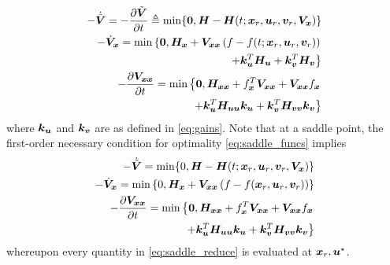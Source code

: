 %
\begin{subequations}
	\begin{align}
		- \dot{ \tilde{\bm{V}}} = - \dfrac{\partial \tilde{\bm{V}}}{\partial t} \triangleq \min\{\bm{0}, \bm{H} - \bm{H}(t; \bm{x}_r, \bm{u}_r, \bm{v}_r, \bm{V}_{\bm{x}})\} \\
		-\dot{\bm{V}}_{\bm{x}} = \min \left\{\bm{0}, \bm{H}_{\bm{x}} + \bm{V}_{\bm{x}\bm{x}} \left(f-f(t; \bm{x}_r, \bm{u}_r, \bm{v}_r)\right)  \right. \\
		\left.
		+ \bm{k}_{\bm{u}}^T \bm{H}_{\bm{u} } + \bm{k}_{\bm{v}}^T \bm{H}_{\bm{v}} \right\} \\
		-  \dfrac{\partial \bm{V}_{\bm{x} \bm{x}}}{\partial t} = \min \left\{\bm{0}, \bm{H}_{\bm{x} \bm{x}} + f_{\bm{x}}^T\bm{V}_{\bm{x}\bm{x}} + \bm{V}_{\bm{x}\bm{x}} f_{\bm{x}}  \right. \nonumber \\
		\left.
		+ \bm{k}_{\bm{u}}^T \bm{H}_{\bm{u}  \bm{u}}  \bm{k}_{\bm{u}} +  \bm{k}_{\bm{v}}^T \bm{H}_{\bm{v}  \bm{v}}  \bm{k}_{\bm{v}} \right\}
	\end{align}
\end{subequations}
%
where $\bm{k}_{\bm{u}}$ and $\bm{k}_{\bm{v}}$ are as defined in \eqref{eq:gains}. Note that at a saddle point, the first-order necessary condition for optimality \cf \eqref{eq:saddle_funcs} implies  %
%
\begin{subequations}
	\begin{align}
		- \dot{ \tilde{\bm{V}}} = \min\{0, \bm{H} - \bm{H}(t; \bm{x}_r, \bm{u}_r, \bm{v}_r, \bm{V}_{\bm{x}})\} \\
		-\dot{\bm{V}}_{\bm{x}} = \min \left\{0, \bm{H}_{\bm{x}} + \bm{V}_{\bm{x}\bm{x}} \left(f-f(\bm{x}_r, \bm{u}_r, \bm{v}_r)\right) \right\} \\
		-  \dfrac{\partial \bm{V}_{\bm{x} \bm{x}}}{\partial t} = \min \left\{\bm{0}, \bm{H}_{\bm{x} \bm{x}} + f_{\bm{x}}^T\bm{V}_{\bm{x}\bm{x}} + \bm{V}_{\bm{x}\bm{x}} f_{\bm{x}}  \right. \nonumber \\
		\left.
		+ \bm{k}_{\bm{u}}^T \bm{H}_{\bm{u}  \bm{u}}  \bm{k}_{\bm{u}} +  \bm{k}_{\bm{v}}^T \bm{H}_{\bm{v}  \bm{v}}  \bm{k}_{\bm{v}} \right\}
	\end{align}
	\label{eq:saddle_reduce}
\end{subequations}
%
whereupon every quantity in \eqref{eq:saddle_reduce} is evaluated at $\bm{x}_r, \bm{u}^\star$.

